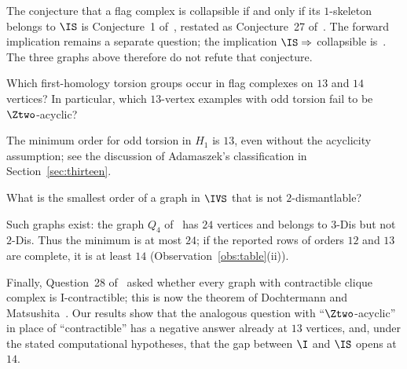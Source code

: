 The conjecture that a flag complex is collapsible if and only if its $1$-skeleton belongs to $\IS$ is Conjecture~1 of~\cite{EFH2022}, restated as Conjecture~27 of~\cite{DEFH2023}. The forward implication remains a separate question; the implication $\IS\Rightarrow$ collapsible is~\cite[Theorem~1]{EFH2022}. The three graphs above therefore do not refute that conjecture.

\begin{question}
Which first-homology torsion groups occur in flag complexes on $13$ and $14$ vertices? In particular, which $13$-vertex examples with odd torsion fail to be $\Ztwo$-acyclic?
\end{question}

The minimum order for odd torsion in $H_1$ is $13$, even without the acyclicity assumption; see the discussion of Adamaszek's classification in Section~\ref{sec:thirteen}.

\begin{question}
What is the smallest order of a graph in $\IVS$ that is not $2$-dismantlable?
\end{question}

Such graphs exist: the graph $Q_4$ of~\cite[Proposition~8]{FieuxJouve2020} has $24$ vertices and belongs to $3$-Dis but not $2$-Dis. Thus the minimum is at most $24$; if the reported rows of orders $12$ and $13$ are complete, it is at least $14$ (Observation~\ref{obs:table}(ii)).

Finally, Question~28 of~\cite{DEFH2023} asked whether every graph with contractible clique complex is I-contractible; this is now the theorem of Dochtermann and Matsushita~\cite{DochtermannMatsushita2025}. Our results show that the analogous question with ``$\Ztwo$-acyclic'' in place of ``contractible'' has a negative answer already at $13$ vertices, and, under the stated computational hypotheses, that the gap between $\I$ and $\IS$ opens at $14$.
